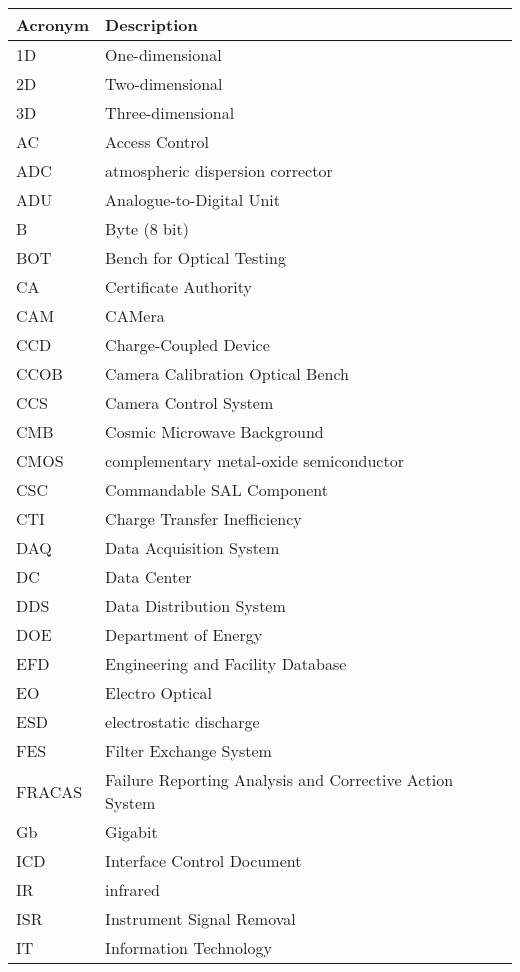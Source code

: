 \addtocounter{table}{-1}
\begin{longtable}{p{}p{}}\hline
\textbf{Acronym} & \textbf{Description}  \\\hline

1D & One-dimensional \\\hline
2D & Two-dimensional \\\hline
3D & Three-dimensional \\\hline
AC & Access Control \\\hline
ADC & atmospheric dispersion corrector \\\hline
ADU & Analogue-to-Digital Unit \\\hline
B & Byte (8 bit) \\\hline
BOT & Bench for Optical Testing \\\hline
CA & Certificate Authority \\\hline
CAM & CAMera \\\hline
CCD & Charge-Coupled Device \\\hline
CCOB & Camera Calibration Optical Bench \\\hline
CCS & Camera Control System \\\hline
CMB & Cosmic Microwave Background \\\hline
CMOS & complementary metal-oxide semiconductor \\\hline
CSC & Commandable SAL Component \\\hline
CTI & Charge Transfer Inefficiency \\\hline
DAQ & Data Acquisition System \\\hline
DC & Data Center \\\hline
DDS & Data Distribution System \\\hline
DOE & Department of Energy \\\hline
EFD & Engineering and Facility Database \\\hline
EO & Electro Optical \\\hline
ESD & electrostatic discharge \\\hline
FES & Filter Exchange System \\\hline
FRACAS & Failure Reporting Analysis and Corrective Action System \\\hline
Gb & Gigabit \\\hline
ICD & Interface Control Document \\\hline
IR & infrared \\\hline
ISR & Instrument Signal Removal \\\hline
IT & Information Technology \\\hline

\end{longtable}
